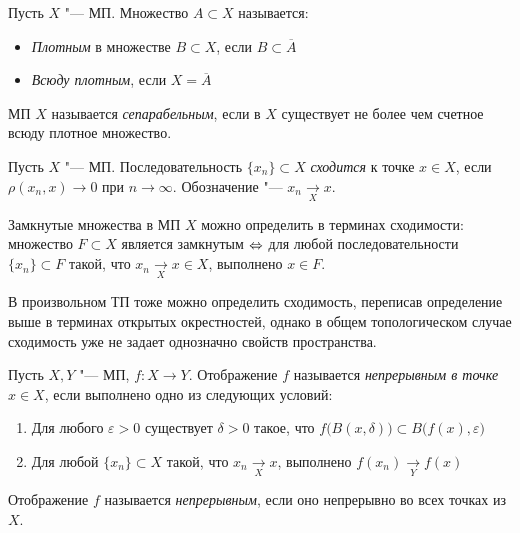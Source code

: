 \begin{definition}
	Пусть $X$ "--- МП. Множество $A \subset X$ называется:
	\begin{itemize}
		\item \textit{Плотным} в множестве $B \subset X$, если $B \subset \overline {A}$
 
		\item \textit{Всюду плотным}, если $X = \overline {A}$
	\end{itemize}
\end{definition}

\begin{definition}\label{separability}
	МП $X$ называется \textit{сепарабельным}, если в $X$ существует не более чем счетное всюду плотное множество.
\end{definition}

\begin{definition}
	Пусть $X$ "--- МП. Последовательность $\{x_n\} \subset X$ \textit{сходится} к точке $x \in X$, если $\rho(x_n, x) \to 0$ при $n \to \infty$. Обозначение "--- $x_n \xrightarrow[X]{} x$.
\end{definition}

\begin{note}
	Замкнутые множества в МП $X$ можно определить в терминах сходимости: множество $F \subset X$ является замкнутым $\Leftrightarrow$ для любой последовательности $\{x_n\} \subset F$ такой, что $x_n \xrightarrow[X]{} x \in X$, выполнено $x \in F$.
\end{note}

\begin{note}
	В произвольном ТП тоже можно определить сходимость, переписав определение выше в терминах открытых окрестностей, однако в общем топологическом случае сходимость уже не задает однозначно свойств пространства.
\end{note}

\begin{definition}
	Пусть $X, Y$ "--- МП, $f : X \to Y$. Отображение $f$ называется \textit{непрерывным в точке} $x \in X$, если выполнено одно из следующих условий:
	\begin{enumerate}
		\item Для любого $\varepsilon > 0$ существует $\delta > 0$ такое, что $f\big(B(x, \delta)\big) \subset B\big(f(x), \varepsilon\big)$
		
		\item Для любой $\{x_n\} \subset X$ такой, что $x_n \xrightarrow[X]{} x$, выполнено $f(x_n) \xrightarrow[Y]{} f(x)$
	\end{enumerate}

	Отображение $f$ называется \textit{непрерывным}, если оно непрерывно во всех точках из $X$.
\end{definition}

